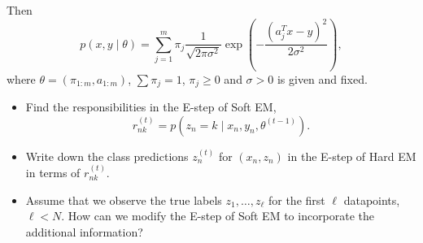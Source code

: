 Then
\[
p(x, y \mid \theta) = \sum_{j=1}^{m} \pi_j \frac{1}{\sqrt{2\pi\sigma^2}} \exp \left( -\frac{\left( a_j^T x - y \right)^2}{2\sigma^2} \right),
\]
where $\theta = (\pi_{1:m}, a_{1:m})$, $\sum \pi_j = 1$, $\pi_j \ge 0$ and $\sigma > 0$ is given and fixed.

\begin{itemize}
    \item Find the responsibilities in the E-step of Soft EM,
    \[
    r_{nk}^{(t)} = p \left( z_n = k \mid x_n, y_n, \theta^{(t-1)} \right).
    \]
    
    \item Write down the class predictions $z_n^{(t)}$ for $(x_n, z_n)$ in the E-step of Hard EM in terms of $r_{nk}^{(t)}$.
    
    \item Assume that we observe the true labels $z_1, \ldots, z_\ell$ for the first $\ell$ datapoints, $\ell < N$. How can we modify the E-step of Soft EM to incorporate the additional information?
\end{itemize}
